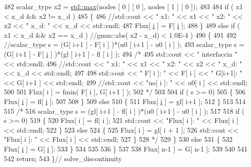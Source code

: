 \begin{DoxyCode}
482         scalar\_type x2 = \hyperlink{UsefulFunctions_8h_a41a4284c74a9bcf6e35509f5eec72a55}{std::max}(nodes [ 0 ] [ 0 ], nodes [ 1 ] [ 0 ]);
483 
484         \textcolor{keywordflow}{if} ( x1 < x\_d &&  x2 != x\_d )
485         \{
486             \textcolor{comment}{//std::cout << " x1: " << x1 << "   x2: " << x2 << "    x\_d: " << x\_d << std::endl;}
487             Flux[ \hyperlink{god__e_8m_a8604be5925f4266ab5ccc69675329c80}{i} ] = F[ \hyperlink{god__e_8m_a8604be5925f4266ab5ccc69675329c80}{i} ];
488         \}
489         \textcolor{keywordflow}{else} \textcolor{keywordflow}{if} ( x1 < x\_d && x2 == x\_d ) \textcolor{comment}{//gmm::abs( x2 - x\_d) < 1.0E-4 )}
490         \{
491 
492             \textcolor{comment}{//scalar\_type s = (G[ i+1 ] - F[ i ] )*(u0 [ i+1 ] - u0 [ i ] );}
493             scalar\_type s = (G[ i+1 ] - F[ \hyperlink{god__e_8m_a8604be5925f4266ab5ccc69675329c80}{i} ] )*(gl [ i+1 ] - fl [ i ] );
494             \textcolor{comment}{/*}
495 \textcolor{comment}{            std::cout << " interfaccia " << std::endl;}
496 \textcolor{comment}{            //std::cout << " x1: " << x1 << "    x2: " << x2 << "   x\_d: " << x\_d << std::endl;}
497 \textcolor{comment}{}
498 \textcolor{comment}{            std::cout << " F[ i ]:  " << F[ i ] << "   G[i+1]: " << G[ i+1 ] << std::endl;}
499 \textcolor{comment}{            //std::cout << "uo[ i ]:  " << u0[ i ] << std::endl;}
500 \textcolor{comment}{}
501 \textcolor{comment}{            Flux[ i ] = fmin( F[ i ], G[ i+1 ] );}
502 \textcolor{comment}{            */}
503 
504             \textcolor{keywordflow}{if} ( s >= 0)
505             \{
506                 Flux[ \hyperlink{god__e_8m_a8604be5925f4266ab5ccc69675329c80}{i} ] = fl[ \hyperlink{god__e_8m_a8604be5925f4266ab5ccc69675329c80}{i} ];
507 
508             \}
509             \textcolor{keywordflow}{else}
510             \{
511                 Flux[ \hyperlink{god__e_8m_a8604be5925f4266ab5ccc69675329c80}{i} ] = gl[ i+1 ];
512             \}
513 
514 
515             \textcolor{comment}{/*}
516 \textcolor{comment}{            scalar\_type s = (gl[ i+1 ] - fl[ i ] )*(u0 [ i+1 ] - u0 [ i ] );}
517 \textcolor{comment}{}
518 \textcolor{comment}{            if ( s >= 0)}
519 \textcolor{comment}{            \{}
520 \textcolor{comment}{                Flux[ i ] = fl[ i ];}
521 \textcolor{comment}{                std::cout << "Flux[ i ]:  " << Flux[ i ] << std::endl;}
522 \textcolor{comment}{            \}}
523 \textcolor{comment}{            else}
524 \textcolor{comment}{            \{}
525 \textcolor{comment}{                Flux[ i ] = gl[ i + 1 ];}
526 \textcolor{comment}{                std::cout << "Flux[ i ]:  " << Flux[ i ] << std::endl;}
527 \textcolor{comment}{            \}}
528 \textcolor{comment}{            */}
529         \}
530         \textcolor{keywordflow}{else}
531         \{
532             Flux[ \hyperlink{god__e_8m_a8604be5925f4266ab5ccc69675329c80}{i} ] = G[ \hyperlink{god__e_8m_a8604be5925f4266ab5ccc69675329c80}{i} ];
533         \}
534 
535 
536     \}
537 
538     Flux[ n-1 ] = G[ n-1 ];
539 
540 
541 
542     \textcolor{keywordflow}{return};
543 \}\textcolor{comment}{// solve\_discontinuity}
\end{DoxyCode}


